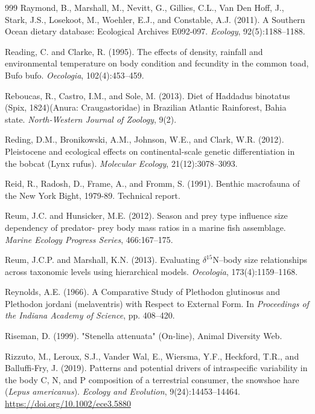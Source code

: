 \begin{thebibliography}{999}
Raymond, B., Marshall, M., Nevitt, G., Gillies, C.L., Van Den Hoff, J., Stark, J.S., Losekoot, M., Woehler, E.J., and Constable, A.J. (2011). A Southern Ocean dietary database: Ecological Archives E092-097. \textit{Ecology}, 92(5):1188--1188.

Reading, C. and Clarke, R. (1995). The effects of density, rainfall and environmental temperature on body condition and fecundity in the common toad, Bufo bufo. \textit{Oecologia}, 102(4):453--459.

Reboucas, R., Castro, I.M., and Sole, M. (2013). Diet of Haddadus binotatus (Spix, 1824)(Anura: Craugastoridae) in Brazilian Atlantic Rainforest, Bahia state. \textit{North-Western Journal of Zoology}, 9(2).

Reding, D.M., Bronikowski, A.M., Johnson, W.E., and Clark, W.R. (2012). Pleistocene and ecological effects on continental-scale genetic differentiation in the bobcat (Lynx rufus). \textit{Molecular Ecology}, 21(12):3078--3093.

Reid, R., Radosh, D., Frame, A., and Fromm, S. (1991). Benthic macrofauna of the New York Bight, 1979-89. Technical report.

Reum, J.C. and Hunsicker, M.E. (2012). Season and prey type influence size dependency of predator- prey body mass ratios in a marine fish assemblage. \textit{Marine Ecology Progress Series}, 466:167--175.

Reum, J.C.P. and Marshall, K.N. (2013). Evaluating $\delta^ 15${N}--body size relationships across taxonomic levels using hierarchical models. \textit{Oecologia}, 173(4):1159--1168.

Reynolds, A.E. (1966). A Comparative Study of Plethodon glutinosus and Plethodon jordani (melaventris) with Respect to External Form. In \textit{Proceedings of the Indiana Academy of Science}, pp. 408--420.

Riseman, D. (1999). "Stenella attenuata" (On-line), {Animal Diversity Web}.

Rizzuto, M., Leroux, S.J., Vander Wal, E., Wiersma, Y.F., Heckford, T.R., and Balluffi-Fry, J. (2019). Patterns and potential drivers of intraspecific variability in the body {C}, {N}, and {P} composition of a terrestrial consumer, the snowshoe hare ({\em Lepus americanus}). \textit{Ecology and Evolution}, 9(24):14453--14464. \url{https://doi.org/10.1002/ece3.5880}


\end{thebibliography}
